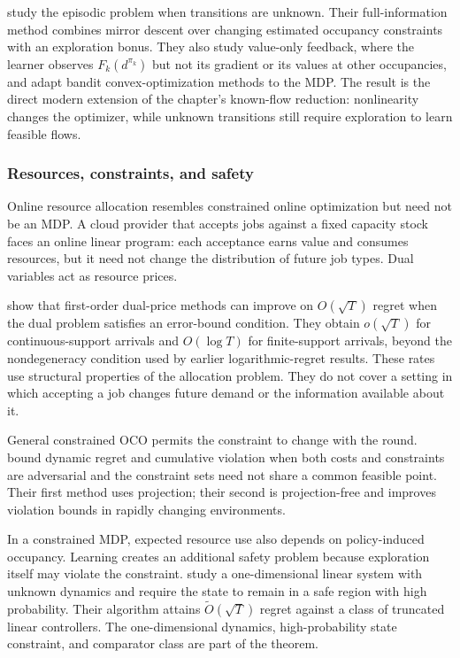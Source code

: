 \citet{moreno2025convexrl} study the episodic problem when transitions are unknown. Their full-information method combines mirror descent over changing estimated occupancy constraints with an exploration bonus. They also study value-only feedback, where the learner observes $F_k(d^{\pi_k})$ but not its gradient or its values at other occupancies, and adapt bandit convex-optimization methods to the MDP. The result is the direct modern extension of the chapter's known-flow reduction: nonlinearity changes the optimizer, while unknown transitions still require exploration to learn feasible flows.

\subsubsection{Resources, constraints, and safety}

Online resource allocation resembles constrained online optimization but need not be an MDP. A cloud provider that accepts jobs against a fixed capacity stock faces an online linear program: each acceptance earns value and consumes resources, but it need not change the distribution of future job types. Dual variables act as resource prices.

\citet{gao2026beyond} show that first-order dual-price methods can improve on $O(\sqrt T)$ regret when the dual problem satisfies an error-bound condition. They obtain $o(\sqrt T)$ for continuous-support arrivals and $O(\log T)$ for finite-support arrivals, beyond the nondegeneracy condition used by earlier logarithmic-regret results. These rates use structural properties of the allocation problem. They do not cover a setting in which accepting a job changes future demand or the information available about it.

General constrained OCO permits the constraint to change with the round. \citet{supantha2026constraints} bound dynamic regret and cumulative violation when both costs and constraints are adversarial and the constraint sets need not share a common feasible point. Their first method uses projection; their second is projection-free and improves violation bounds in rapidly changing environments.

In a constrained MDP, expected resource use also depends on policy-induced occupancy. Learning creates an additional safety problem because exploration itself may violate the constraint. \citet{schiffer2026safe} study a one-dimensional linear system with unknown dynamics and require the state to remain in a safe region with high probability. Their algorithm attains $\widetilde O(\sqrt T)$ regret against a class of truncated linear controllers. The one-dimensional dynamics, high-probability state constraint, and comparator class are part of the theorem.

